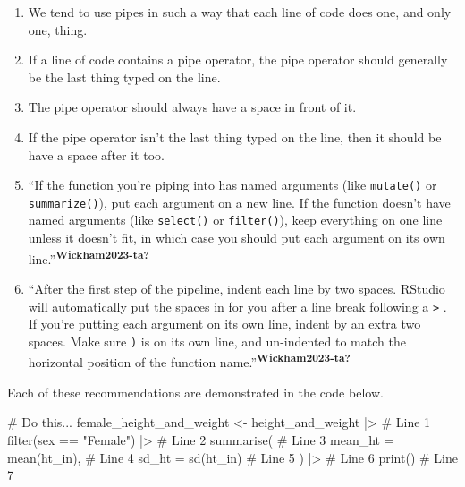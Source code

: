 \documentclass[
  letterpaper,
  DIV=11,
  numbers=noendperiod]{scrreprt}
\newenvironment{Shaded}{\begin{snugshade}}{\end{snugshade}}
\newcommand{\AttributeTok}[1]{\textcolor[rgb]{0.40,0.45,0.13}{#1}}
\newcommand{\CommentTok}[1]{\textcolor[rgb]{0.37,0.37,0.37}{#1}}
\newcommand{\FunctionTok}[1]{\textcolor[rgb]{0.28,0.35,0.67}{#1}}
\newcommand{\NormalTok}[1]{\textcolor[rgb]{0.00,0.23,0.31}{#1}}
\newcommand{\OtherTok}[1]{\textcolor[rgb]{0.00,0.23,0.31}{#1}}
\newcommand{\SpecialCharTok}[1]{\textcolor[rgb]{0.37,0.37,0.37}{#1}}
\newcommand{\StringTok}[1]{\textcolor[rgb]{0.13,0.47,0.30}{#1}}
\begin{document}
\begin{enumerate}
\def\labelenumi{\arabic{enumi}.}
\item
  We tend to use pipes in such a way that each line of code does one,
  and only one, thing.
\item
  If a line of code contains a pipe operator, the pipe operator should
  generally be the last thing typed on the line.
\item
  The pipe operator should always have a space in front of it.
\item
  If the pipe operator isn't the last thing typed on the line, then it
  should be have a space after it too.
\item
  ``If the function you're piping into has named arguments (like
  \texttt{mutate()} or \texttt{summarize()}), put each argument on a new
  line. If the function doesn't have named arguments (like
  \texttt{select()} or \texttt{filter()}), keep everything on one line
  unless it doesn't fit, in which case you should put each argument on
  its own line.''\textsuperscript{\textbf{Wickham2023-ta?}}
\item
  ``After the first step of the pipeline, indent each line by two
  spaces. RStudio will automatically put the spaces in for you after a
  line break following a \texttt{\textbar{}\textgreater{}} . If you're
  putting each argument on its own line, indent by an extra two spaces.
  Make sure \texttt{)} is on its own line, and un-indented to match the
  horizontal position of the function
  name.''\textsuperscript{\textbf{Wickham2023-ta?}}
\end{enumerate}

Each of these recommendations are demonstrated in the code below.

\begin{Shaded}
\begin{Highlighting}[]
\CommentTok{\# Do this...}
\NormalTok{female\_height\_and\_weight }\OtherTok{\textless{}{-}}\NormalTok{ height\_and\_weight }\SpecialCharTok{|\textgreater{}} \CommentTok{\# Line 1}
  \FunctionTok{filter}\NormalTok{(sex }\SpecialCharTok{==} \StringTok{"Female"}\NormalTok{) }\SpecialCharTok{|\textgreater{}}                     \CommentTok{\# Line 2}
  \FunctionTok{summarise}\NormalTok{(                                     }\CommentTok{\# Line 3}
    \AttributeTok{mean\_ht =} \FunctionTok{mean}\NormalTok{(ht\_in),                       }\CommentTok{\# Line 4}
    \AttributeTok{sd\_ht   =} \FunctionTok{sd}\NormalTok{(ht\_in)                          }\CommentTok{\# Line 5}
\NormalTok{  ) }\SpecialCharTok{|\textgreater{}}                                           \CommentTok{\# Line 6}
  \FunctionTok{print}\NormalTok{()                                        }\CommentTok{\# Line 7}
\end{Highlighting}
\end{Shaded}
\end{document}
